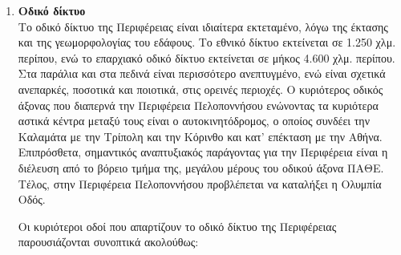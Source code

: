 \documentclass[12pt]{article}
\begin{document}
	\begin{enumerate}
		\item \textbf{Οδικό δίκτυο} \\
		Το οδικό δίκτυο της Περιφέρειας είναι ιδιαίτερα εκτεταμένο, λόγω της έκτασης και της γεωμορφολογίας του εδάφους. Το εθνικό δίκτυο εκτείνεται σε 1.250 χλμ. περίπου, ενώ το επαρχιακό οδικό δίκτυο εκτείνεται σε μήκος 4.600 χλμ. περίπου. Στα παράλια και στα πεδινά είναι περισσότερο ανεπτυγμένο, ενώ είναι σχετικά ανεπαρκές, ποσοτικά και ποιοτικά, στις ορεινές περιοχές. Ο κυριότερος οδικός άξονας που διαπερνά την Περιφέρεια Πελοποννήσου ενώνοντας τα κυριότερα αστικά κέντρα μεταξύ τους είναι ο αυτοκινητόδρομος, ο οποίος συνδέει την Καλαμάτα με την Τρίπολη και την Κόρινθο και κατ’ επέκταση με την Αθήνα. Επιπρόσθετα, σημαντικός αναπτυξιακός παράγοντας για την Περιφέρεια είναι η διέλευση από το βόρειο τμήμα της, μεγάλου μέρους του οδικού άξονα ΠΑΘΕ. Τέλος, στην Περιφέρεια Πελοποννήσου προβλέπεται να καταλήξει η Ολυμπία Οδός.
		
		Οι κυριότεροι οδοί που απαρτίζουν το οδικό δίκτυο της Περιφέρειας παρουσιάζονται συνοπτικά ακολούθως:
		

\end{enumerate}
\end{document}

